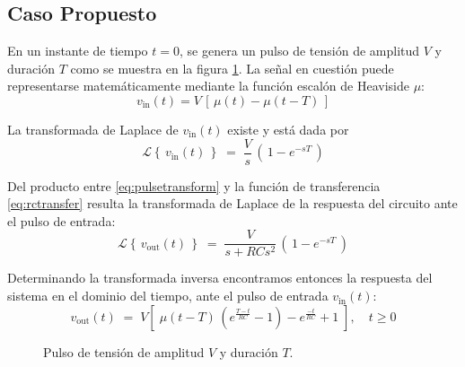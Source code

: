 \documentclass[parskip]{scrartcl}
\newcommand{\laplace}[1]{\mathcal{L}\left\{\,#1\,\right\}}
\begin{document}
\subsection{Caso Propuesto}

En un instante de tiempo $t = 0$, se genera un pulso de tensión de amplitud $V$ y duración $T$ como se muestra en la figura \ref{fig:pulse}. La señal en cuestión puede representarse matemáticamente mediante la función escalón de Heaviside $\mu$:
%
$$ v_\mathrm{in}(t) = V\,\left[\, \mu(t) - \mu(t - T) \,\right] $$

La transformada de Laplace de $v_\mathrm{in}(t)$ existe y está dada por
%
\begin{equation}\label{eq:pulsetransform}
\laplace{v_\mathrm{in}(t)} \;=\; \frac{V}{s}\,\left(\,1 - e^{-sT}\,\right)
\end{equation}

Del producto entre \eqref{eq:pulsetransform} y la función de transferencia \eqref{eq:rctransfer} resulta la transformada de Laplace de la respuesta del circuito ante el pulso de entrada:
%
$$
\laplace{v_\mathrm{out}(t)} \;=\; \frac{V}{s + RC s^2}\,\left(\,1 - e^{-sT}\,\right)
$$

Determinando la transformada inversa encontramos entonces la respuesta del sistema en el dominio del tiempo, ante el pulso de entrada $v_\mathrm{in}(t)$:
%
\begin{equation}\label{eq:pulseout}
v_\mathrm{out}(t) \;=\; V \left[\; \mu(t - T)\,\left( e^\frac{T-t}{RC} - 1 \right) - e^\frac{-t}{RC} + 1 \;\right], \quad t \geq 0
\end{equation}

\begin{figure}[t]
\centering
{}
\caption{Pulso de tensión de amplitud $V$ y duración $T$.}
\label{fig:pulse}
\end{figure}
\end{document}
